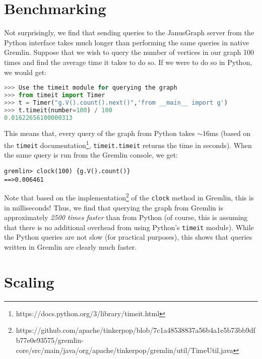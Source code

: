 \documentclass[12pt]{article}
\newcommand{\code}[1]{\colorbox{backcolour}{\texttt{#1}}}
\begin{document}
\newpage

\section{Benchmarking}

Not surprisingly, we find that sending queries to the JanusGraph server from the Python interface takes much longer than performing the same queries in native Gremlin. Suppose that we wish to query the number of vertices in our graph 100 times and find the average time it takes to do so. If we were to do so in Python, we would get:
\begin{lstlisting}[language=Python, numbers=none]
>>> Use the timeit module for querying the graph
>>> from timeit import Timer
>>> t = Timer("g.V().count().next()",'from __main__ import g')
>>> t.timeit(number=100) / 100
0.01622656100000313
\end{lstlisting}

This means that, every query of the graph from Python takes $\sim$16ms (based on the \code{timeit} documentation\footnote{https://docs.python.org/3/library/timeit.html}, \code{timeit.timeit} returns the time in seconds). When the same query is run from the Gremlin console, we get:
\begin{lstlisting}[numbers=none]
gremlin> clock(100) {g.V().count()}
==>0.006461
\end{lstlisting}

Note that based on the implementation\footnote{https://github.com/apache/tinkerpop/blob/7c1a48538837a56b4a1e5b73bb9dfb77e0e93575/gremlin-core/src/main/java/org/apache/tinkerpop/gremlin/util/TimeUtil.java} of the \code{clock} method in Gremlin, this is in milliseconds! Thus, we find that querying the graph from Gremlin is approximately \textit{2500 times faster} than from Python (of course, this is assuming that there is no additional overhead from using Python's \code{timeit} module). While the Python queries are not slow (for practical purposes), this shows that queries written in Gremlin are clearly much faster.

\section{Scaling}
\end{document}

